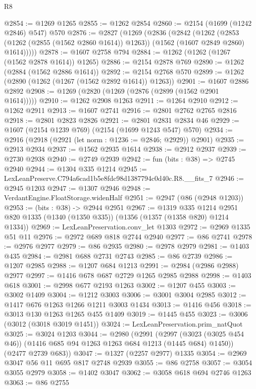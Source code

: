 \begin{lexlean}{R8}
\begin{coremodule}
@2854 := @1269 @1265
@2855 := @1262 @2854
@2860 := @2154 (@1699 (@1242 @2846) @547) @570
@2876 := @2827
    (@1269
      (@2836
        (@2842
          (@1262
            (@2853 (@1262 (@2855 (@1562 @2860 @1614)) @1263))
            (@1562 (@1607 @2849 @2860) @1614)))))
@2878 := @1607 @2758 @794
@2884 := @1262 (@1262 (@1267 (@1562 @2878 @1614)) @1265)
@2886 := @2154 @2878 @769
@2890 := @1262 (@2884 (@1562 @2886 @1614))
@2892 := @2154 @2768 @570
@2899 := @1262 (@2890 (@1262 (@1267 (@1562 @2892 @1614)) @1263))
@2901 := @1607 @2886 @2892
@2908 := @1269 (@2820 (@1269 (@2876 (@2899 (@1562 @2901 @1614)))))
@2910 := @1262 @2908 @1263
@2911 := @1264 @2910
@2912 := @1262 @2911
@2913 := @1607 @2741
@2916 := @2801 @2762 @2765 @2816
@2918 := @2801 @2823 @2826
@2921 := @2801 @2831 @2834 @46
@2929 := @1607 (@2154 @1239 @769) (@2154 (@1699 @1243 @547) @570)
@2934 := @2916 (@2918 (@2921 (let norm : @1236 := @2846; @2929)) @2901)
@2935 := @2913 @2934
@2937 := @1562 @2935 @1614
@2938 := @2912 @2937
@2939 := @2730 @2938
@2940 := @2749 @2939
@2942 := fun (bits : @38) => @2745 @2940
@2944 := @1304 @335 @1214
@2945 := LexLeanPreserve.C794a6cad1b5e8fdc98d1387794c0d40c.R8.__fits_7
@2946 := @2945 @1203
@2947 := @1307 @2946
@2948 := VerdantEngine.FloatStorage.widenHalf
@2951 := @2947 (@86 (@2948 @1203))
@2953 := (bits : @38) -> @2944 @2951
@2967 := @1319
    @335
    @1214
    @2951
    @820
    @1335
    (@1340 (@1350 @335))
    (@1356 (@1357 (@1358 @820) @1214 @1334))
@2969 := LexLeanPreservation.conv_let @1303
@2972 := @2969 @1335 @51 @11
@2976 := @2972 @689 @818 @2744 @2940
@2977 := @86 @2741
@2978 := @2976 @2977
@2979 := @86 @2935
@2980 := @2978 @2979
@2981 := @1403 @435
@2984 := @2981 @688 @2731 @2743
@2985 := @86 @2739
@2986 := @1207 @2985
@2988 := @1207 @684 @1213
@2991 := @2984 (@2986 @2988) @2977
@2997 := @1416 @678 @687 @2729 @1265 @2985 @2988
@2998 := @1403 @618
@3001 := @2998 @677 @2193 @1263
@3002 := @1207 @455
@3003 := @3002 @1409
@3004 := @1212 @3003
@3006 := @3001 @3004 @2985
@3012 := @1417 @676 @1263 @1266 @1211 @3003 @1434
@3013 := @1416 @456
@3018 := @3013 @130 @1263 @1265 @455 @1409
@3019 := @1445 @455
@3023 := @3006 (@3012 (@3018 @3019 @1451))
@3024 := LexLeanPreservation.prim_natQuot
@3025 := @3024 @1203
@3044 := @2980
    (@2991
      (@2997 (@3023 (@3025 @454 @46)) (@1416 @685 @94 @1263 @1263 @684 @1213 (@1445 @684) @1450))
      (@2477 @2739 @683))
@3047 := @1327 (@2257 @2977) @1335
@3054 := @2969 @3047 @56 @11 @695 @817 @2748 @2939
@3055 := @86 @2758
@3057 := @3054 @3055 @2979
@3058 := @1402 @3047
@3062 := @3058 @618 @694 @2746 @1263
@3063 := @86 @2755

\end{coremodule}
\end{lexlean}
